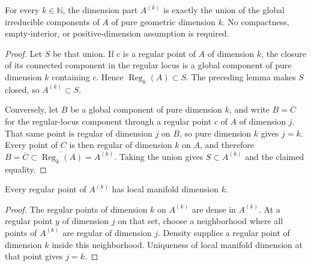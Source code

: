 \begin{theorem}
\label{hir:dimension-part-global-component-union}
\leanok
For every $k\in\mathbb N$, the dimension part $A^{(k)}$ is exactly the union
of the global irreducible components of $A$ of pure geometric dimension $k$.
No compactness, empty-interior, or positive-dimension assumption is required.
\end{theorem}
\begin{proof}
Let $S$ be that union. If $c$ is a regular point of $A$ of dimension $k$,
the closure of its connected component in the regular locus is a global
component of pure dimension $k$ containing $c$. Hence
$\operatorname{Reg}_k(A)\subset S$. The preceding lemma makes $S$ closed,
so $A^{(k)}\subset S$.

Conversely, let $B$ be a global component of pure dimension $k$, and write
$B=\overline C$ for the regular-locus component through a regular point $c$
of $A$ of dimension $j$. That same point is regular of dimension $j$ on $B$,
so pure dimension $k$ gives $j=k$. Every point of $C$ is then regular of
dimension $k$ on $A$, and therefore
$B=\overline C\subset\overline{\operatorname{Reg}_k(A)}=A^{(k)}$.
Taking the union gives $S\subset A^{(k)}$ and the claimed equality.
\end{proof}

\begin{lemma}
\label{hir:dimension-part-geometric-purity}
\leanok
Every regular point of $A^{(k)}$ has local manifold dimension $k$.
\end{lemma}
\begin{proof}
The regular points of dimension $k$ on $A^{(k)}$ are dense in $A^{(k)}$.
At a regular point $y$ of dimension $j$ on that set, choose a neighborhood
where all points of $A^{(k)}$ are regular of dimension $j$. Density supplies
a regular point of dimension $k$ inside this neighborhood. Uniqueness of
local manifold dimension at that point gives $j=k$.
\end{proof}


